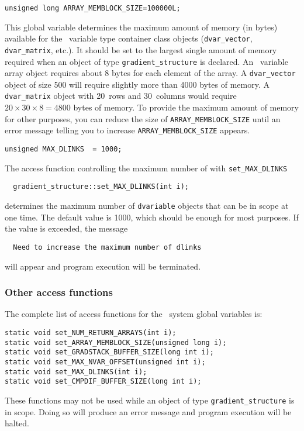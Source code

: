 \documentclass{admbmanual}
\begin{document}
\bigskip
{}
\begin{lstlisting}
unsigned long ARRAY_MEMBLOCK_SIZE=100000L;
\end{lstlisting}
This global variable determines the maximum amount of memory (in bytes)
available for the \scAD\ variable type container class objects
(\texttt{dvar\_vector}, \texttt{dvar\_matrix}, etc.). It should be set to the
largest single amount of memory required when an object of type
\texttt{gradient\_structure} is declared. An \scAD\ variable array object
requires about 8 bytes for each element of the array. A \texttt{dvar\_vector}
object of size 500 will require slightly more than 4000 bytes of memory. A
\texttt{dvar\_matrix} object with 20~rows and 30~columns would require $ 20
\times 30 \times 8 = 4800$ bytes of memory. To provide the maximum amount of
memory for other purposes, you can reduce the size of
\texttt{ARRAY\_MEMBLOCK\_SIZE} until an error message telling you to increase
\texttt{ARRAY\_MEMBLOCK\_SIZE} appears.

\begin{lstlisting}
unsigned MAX_DLINKS  = 1000;
\end{lstlisting}
The access function
%
{controlling the maximum number of with \texttt{set\_MAX\_DLINKS}}
\begin{lstlisting}
  gradient_structure::set_MAX_DLINKS(int i);
\end{lstlisting}
determines the maximum number of \texttt{dvariable} objects that can be in scope
at one time. The default value is 1000, which should be enough for most
purposes. If the value is exceeded, the message
\begin{lstlisting}
  Need to increase the maximum number of dlinks
\end{lstlisting}
will appear and program execution will be terminated.

\subsubsection{Other access functions}

The complete list of access functions for the \scAD\ system global variables is:
\begin{lstlisting}
static void set_NUM_RETURN_ARRAYS(int i);
static void set_ARRAY_MEMBLOCK_SIZE(unsigned long i);
static void set_GRADSTACK_BUFFER_SIZE(long int i);
static void set_MAX_NVAR_OFFSET(unsigned int i);
static void set_MAX_DLINKS(int i);
static void set_CMPDIF_BUFFER_SIZE(long int i);
\end{lstlisting}
These functions may not be used while an object of type
\texttt{gradient\_structure} is in scope. Doing so will produce an error message
and program execution will be halted.
\end{document}

